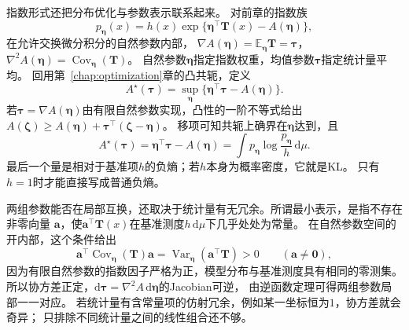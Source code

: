 指数形式还把分布优化与参数表示联系起来。
对前章的指数族
\[
  p_{\bm\eta}(x)
  =h(x)\exp\{\bm\eta^\top\bm T(x)-A(\bm\eta)\},
\]
在允许交换微分积分的自然参数内部，
\(\nabla A(\bm\eta)=\mathbb E_{\bm\eta}\bm T=\bm\tau\)，
\(\nabla^2A(\bm\eta)=\operatorname{Cov}_{\bm\eta}(\bm T)\)。
自然参数\(\bm\eta\)指定指数权重，均值参数\(\bm\tau\)指定统计量平均。
回用第~\ref{chap:optimization}章的凸共轭，定义
\begin{equation}
  A^\star(\bm\tau)
  =\sup_{\bm\eta}\{\bm\eta^\top\bm\tau-A(\bm\eta)\}.
  \label{eq:information-log-partition-conjugate}
\end{equation}
若\(\bm\tau=\nabla A(\bm\eta)\)由有限自然参数实现，凸性的一阶不等式给出
\(A(\bm\zeta)\geq A(\bm\eta)+\bm\tau^\top(\bm\zeta-\bm\eta)\)。
移项可知共轭上确界在\(\bm\eta\)达到，且
\[
  A^\star(\bm\tau)=\bm\eta^\top\bm\tau-A(\bm\eta)
  =\int p_{\bm\eta}\log\frac{p_{\bm\eta}}h\,\mathrm d\mu.
\]
最后一个量是相对于基准项\(h\)的负熵；若\(h\)本身为概率密度，它就是KL。
只有\(h=1\)时才能直接写成普通负熵。

两组参数能否在局部互换，还取决于统计量有无冗余。所谓最小表示，是指不存在非零向量
\(\bm a\)，使\(\bm a^\top\bm T(x)\)在基准测度\(h\,\mathrm d\mu\)下几乎处处为常量。
在自然参数空间的开内部，这个条件给出
\[
 \bm a^\top\operatorname{Cov}_{\bm\eta}(\bm T)\bm a
 =\operatorname{Var}_{\bm\eta}(\bm a^\top\bm T)>0
 \qquad(\bm a\neq\bm0),
\]
因为有限自然参数的指数因子严格为正，模型分布与基准测度具有相同的零测集。
所以协方差正定，\(\mathrm d\bm\tau=\nabla^2A\,\mathrm d\bm\eta\)的Jacobian可逆，
由逆函数定理可得两组参数局部一一对应。
若统计量有含常量项的仿射冗余，例如某一坐标恒为\(1\)，协方差就会奇异；
只排除不同统计量之间的线性组合还不够。

